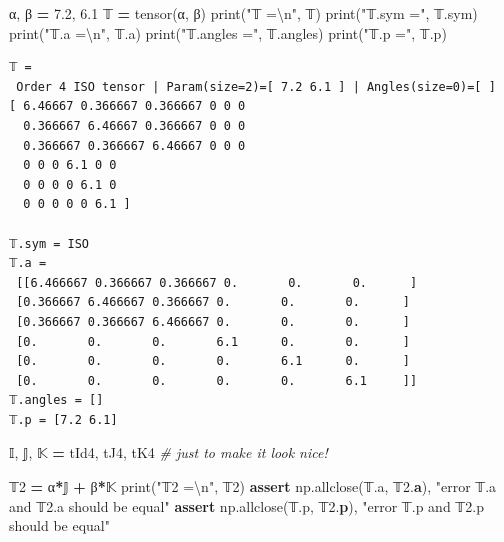 \documentclass[
  a4paper,
  numbers=noendperiod,
  DIV=12]{scrreprt}
\newenvironment{Shaded}{\begin{snugshade}}{\end{snugshade}}
\newcommand{\BuiltInTok}[1]{#1}
\newcommand{\CharTok}[1]{\textcolor[rgb]{0.31,0.60,0.02}{#1}}
\newcommand{\CommentTok}[1]{\textcolor[rgb]{0.56,0.35,0.01}{\textit{#1}}}
\newcommand{\ControlFlowTok}[1]{\textcolor[rgb]{0.13,0.29,0.53}{\textbf{#1}}}
\newcommand{\DecValTok}[1]{\textcolor[rgb]{0.00,0.00,0.81}{#1}}
\newcommand{\ErrorTok}[1]{\textcolor[rgb]{0.64,0.00,0.00}{\textbf{#1}}}
\newcommand{\FloatTok}[1]{\textcolor[rgb]{0.00,0.00,0.81}{#1}}
\newcommand{\NormalTok}[1]{#1}
\newcommand{\OperatorTok}[1]{\textcolor[rgb]{0.81,0.36,0.00}{\textbf{#1}}}
\newcommand{\StringTok}[1]{\textcolor[rgb]{0.31,0.60,0.02}{#1}}
\begin{document}
\begin{Shaded}
\begin{Highlighting}[]
\NormalTok{α, β }\OperatorTok{=} \FloatTok{7.2}\NormalTok{, }\FloatTok{6.1}
\NormalTok{𝕋 }\OperatorTok{=}\NormalTok{ tensor(α, β)}
\BuiltInTok{print}\NormalTok{(}\StringTok{"𝕋 =}\CharTok{\textbackslash{}n}\StringTok{"}\NormalTok{, 𝕋)}
\BuiltInTok{print}\NormalTok{(}\StringTok{"𝕋.sym ="}\NormalTok{, 𝕋.sym)}
\BuiltInTok{print}\NormalTok{(}\StringTok{"𝕋.a =}\CharTok{\textbackslash{}n}\StringTok{"}\NormalTok{, 𝕋.a)}
\BuiltInTok{print}\NormalTok{(}\StringTok{"𝕋.angles ="}\NormalTok{, 𝕋.angles)}
\BuiltInTok{print}\NormalTok{(}\StringTok{"𝕋.p ="}\NormalTok{, 𝕋.p)}
\end{Highlighting}
\end{Shaded}

\begin{verbatim}
𝕋 =
 Order 4 ISO tensor | Param(size=2)=[ 7.2 6.1 ] | Angles(size=0)=[ ]
[ 6.46667 0.366667 0.366667 0 0 0 
  0.366667 6.46667 0.366667 0 0 0 
  0.366667 0.366667 6.46667 0 0 0 
  0 0 0 6.1 0 0 
  0 0 0 0 6.1 0 
  0 0 0 0 0 6.1 ]

𝕋.sym = ISO
𝕋.a =
 [[6.466667 0.366667 0.366667 0.       0.       0.      ]
 [0.366667 6.466667 0.366667 0.       0.       0.      ]
 [0.366667 0.366667 6.466667 0.       0.       0.      ]
 [0.       0.       0.       6.1      0.       0.      ]
 [0.       0.       0.       0.       6.1      0.      ]
 [0.       0.       0.       0.       0.       6.1     ]]
𝕋.angles = []
𝕋.p = [7.2 6.1]
\end{verbatim}

\begin{Shaded}
\begin{Highlighting}[]
\NormalTok{𝕀, 𝕁, 𝕂 }\OperatorTok{=}\NormalTok{ tId4, tJ4, tK4 }\CommentTok{\# just to make it look nice!}

\NormalTok{𝕋}\DecValTok{2} \OperatorTok{=}\NormalTok{ α}\OperatorTok{*}\NormalTok{𝕁 }\OperatorTok{+}\NormalTok{ β}\OperatorTok{*}\NormalTok{𝕂}
\BuiltInTok{print}\NormalTok{(}\StringTok{"𝕋2 =}\CharTok{\textbackslash{}n}\StringTok{"}\NormalTok{, 𝕋}\DecValTok{2}\NormalTok{)}
\ControlFlowTok{assert}\NormalTok{ np.allclose(𝕋.a, 𝕋}\FloatTok{2.}\ErrorTok{a}\NormalTok{), }\StringTok{"error 𝕋.a and 𝕋2.a should be equal"}
\ControlFlowTok{assert}\NormalTok{ np.allclose(𝕋.p, 𝕋}\FloatTok{2.}\ErrorTok{p}\NormalTok{), }\StringTok{"error 𝕋.p and 𝕋2.p should be equal"}
\end{Highlighting}
\end{Shaded}
\end{document}

